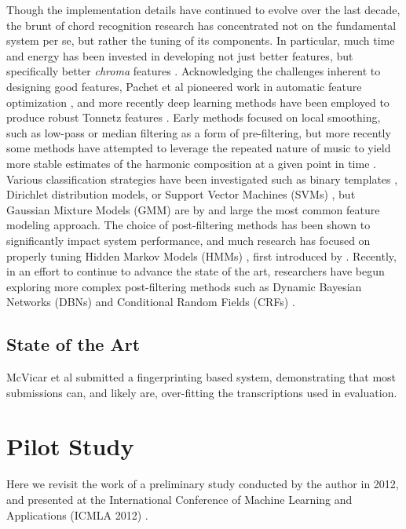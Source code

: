 Though the implementation details have continued to evolve over the last decade, the brunt of chord recognition research has concentrated not on the fundamental system per se, but rather the tuning of its components.
In particular, much time and energy has been invested in developing not just better features, but specifically better \emph{chroma} features \cite{muller2010}.
Acknowledging the challenges inherent to designing good features, Pachet et al pioneered work in automatic feature optimization \cite{pachet2004}, and more recently deep learning methods have been employed to produce robust Tonnetz features \cite{ejh2011}.
Early methods focused on local smoothing, such as low-pass \cite{} or median \cite{} filtering as a form of pre-filtering, but more recently some methods have attempted to leverage the repeated nature of music to yield more stable estimates of the harmonic composition at a given point in time \cite{Cho2011}.
Various classification strategies have been investigated such as binary templates \cite{?}, Dirichlet distribution models, or Support Vector Machines (SVMs) \cite{weller2009}, but Gaussian Mixture Models (GMM) are by and large the most common feature modeling approach.
The choice of post-filtering methods has been shown to significantly impact system performance, and much research has focused on properly tuning Hidden Markov Models (HMMs) \cite{Cho2010}, first introduced by \cite{sheh2003}.
Recently, in an effort to continue to advance the state of the art, researchers have begun exploring more complex post-filtering methods such as Dynamic Bayesian Networks (DBNs) \cite{mauch2010b, McVicar2013} and Conditional Random Fields (CRFs) \cite{?}.


\subsection{State of the Art}
\label{subsec:problem_formulation}

McVicar et al submitted a fingerprinting based system, demonstrating that most submissions can, and likely are, over-fitting the transcriptions used in evaluation.



\section{Pilot Study}
\label{sec:pilot_study}

Here we revisit the work of a preliminary study conducted by the author in 2012, and presented at the International Conference of Machine Learning and Applications (ICMLA 2012) \cite{Humphrey2012}.







